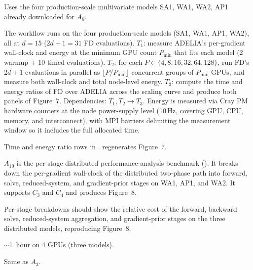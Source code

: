 \documentclass[nonacm,sigconf]{acmart}
\begin{document}

Uses the four production-scale multivariate models SA1, WA1,
WA2, AP1 already downloaded for $A_6$.

\artcomp

The workflow runs on the four production-scale models (SA1,
WA1, AP1, WA2), all at $d{=}15$ ($2d{+}1{=}31$ FD evaluations).
$T_1$: measure ADELIA's per-gradient wall-clock and energy at
the minimum GPU count $P_{\min}$ that fits each model
(2 warmup + 10 timed evaluations).
$T_2$: for each $P \in \{4, 8, 16, 32, 64, 128\}$, run FD's
$2d{+}1$ evaluations in parallel as
$\lfloor P/P_{\min} \rfloor$ concurrent groups of $P_{\min}$
GPUs, and measure both wall-clock and total node-level energy.
$T_3$: compute the time and energy ratios of FD over ADELIA
across the scaling curve and produce both panels of Figure~7.
Dependencies: $T_1, T_2 \rightarrow T_3$.
Energy is measured via Cray PM hardware counters at the node
power-supply level (10\,Hz, covering GPU, CPU, memory, and
interconnect), with MPI barriers delimiting the measurement
window so it includes the full allocated time.

\artout

Time and energy ratio rows in
.
 regenerates
Figure~7.


\newartifact

\artrel

$A_{10}$ is the per-stage distributed performance-analysis
benchmark
(). It breaks
down the per-gradient wall-clock of the distributed two-phase
path into forward, solve, reduced-system, and gradient-prior
stages on WA1, AP1, and WA2. It supports $C_3$ and $C_4$ and
produces Figure~8.

\artexp

Per-stage breakdowns should show the relative cost of the
forward, backward solve, reduced-system aggregation, and
gradient-prior stages on the three distributed models,
reproducing Figure~8.

\arttime

$\sim$1~hour on 4 GPUs (three models).

\artin


Same as $A_3$.

\end{document}
